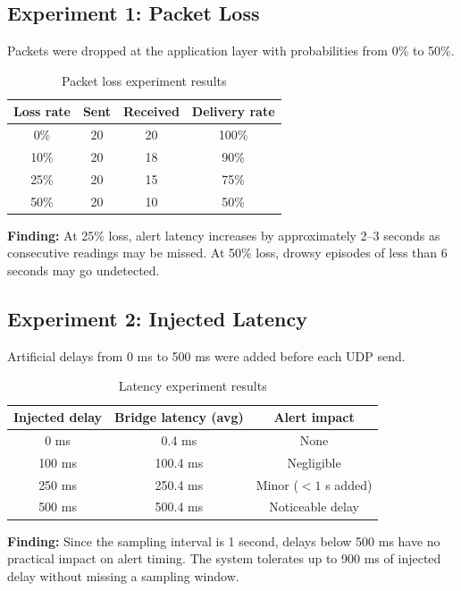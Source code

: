 \documentclass[12pt, a4paper]{article}
\begin{document}
\subsection{Experiment 1: Packet Loss}

Packets were dropped at the application layer with probabilities from 0\% to 50\%.

\begin{table}[H]
\centering
\caption{Packet loss experiment results}
\begin{tabular}{cccc}
\toprule
\textbf{Loss rate} & \textbf{Sent} & \textbf{Received} & \textbf{Delivery rate} \\
\midrule
0\%  & 20 & 20 & 100\% \\
10\% & 20 & 18 & 90\% \\
25\% & 20 & 15 & 75\% \\
50\% & 20 & 10 & 50\% \\
\bottomrule
\end{tabular}
\end{table}

\textbf{Finding:} At 25\% loss, alert latency increases by approximately 2--3 seconds
as consecutive readings may be missed. At 50\% loss, drowsy episodes of less
than 6 seconds may go undetected.

\subsection{Experiment 2: Injected Latency}

Artificial delays from 0 ms to 500 ms were added before each UDP send.

\begin{table}[H]
\centering
\caption{Latency experiment results}
\begin{tabular}{ccc}
\toprule
\textbf{Injected delay} & \textbf{Bridge latency (avg)} & \textbf{Alert impact} \\
\midrule
0 ms   & 0.4 ms & None \\
100 ms & 100.4 ms & Negligible \\
250 ms & 250.4 ms & Minor ($<1$ s added) \\
500 ms & 500.4 ms & Noticeable delay \\
\bottomrule
\end{tabular}
\end{table}

\textbf{Finding:} Since the sampling interval is 1 second, delays below 500 ms
have no practical impact on alert timing. The system tolerates up to 900 ms
of injected delay without missing a sampling window.
\end{document}
